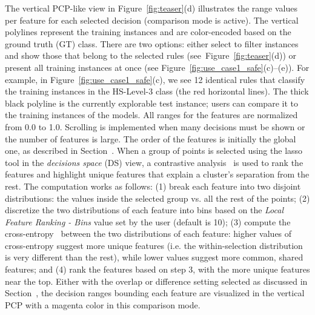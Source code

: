 The vertical PCP-like view in Figure~\ref{fig:teaser}(d) illustrates the range values per feature for each selected decision (comparison mode is active). The vertical polylines represent the training instances and are color-encoded based on the ground truth (GT) class. There are two options: either select to filter instances and show those that belong to the selected rules (see~Figure~\ref{fig:teaser}(d)) or present all training instances at once (see Figure~\ref{fig:use_case1_safe}(c)--(e)). For example, in Figure~\ref{fig:use_case1_safe}(c), we see 12 identical rules that classify the training instances in the HS-Level-3 class (the red horizontal lines). The thick black polyline is the currently explorable test instance; users can compare it to the training instances of the models. All ranges for the features are normalized from 0.0 to 1.0. Scrolling is implemented when many decisions must be shown or the number of features is large. 
The order of the features is initially the global one, as described in Section~. When a group of points is selected using the lasso tool in the \emph{decisions space} (DS) view, a contrastive analysis~\cite{Zou2013Contrastive} is used to rank the features and highlight unique features that explain a cluster's separation from the rest. The computation works as follows:
%
(1) break each feature into two disjoint distributions: the values inside the selected group vs. all the rest of the points; 
(2) discretize the two distributions of each feature into bins based on the \emph{Local Feature Ranking - Bins} value set by the user (default is 10); 
(3) compute the cross-entropy~\cite{Mannor2005The} between the two distributions of each feature: higher values of cross-entropy suggest more unique features (i.e. the within-selection distribution is very different than the rest), while lower values suggest more common, shared features; and
(4) rank the features based on step 3, with the more unique features near the top. Either with the overlap or difference setting selected as discussed in Section~, the decision ranges bounding each feature are visualized in the vertical PCP with a magenta color in this comparison mode.

